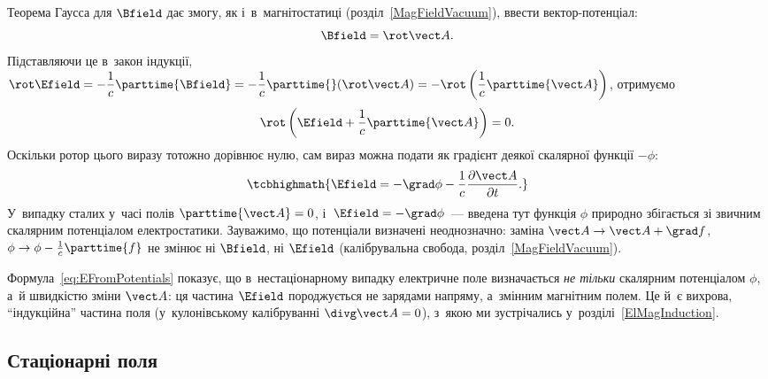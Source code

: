 Теорема Гаусса для $\Bfield$ дає змогу, як і~в~магнітостатиці (розділ~\ref{MagFieldVacuum}),
ввести вектор-потенціал:
\begin{equation*}
	\Bfield = \rot\vect A.
\end{equation*}
Підставляючи це в~закон індукції, $\rot\Efield = -\dfrac1c\parttime{\Bfield} =
-\dfrac1c\parttime{}(\rot\vect A) = -\rot\left(\dfrac1c \parttime{\vect A}\right)$,
отримуємо
\begin{equation*}
	\rot\left(\Efield+\frac1c\parttime{\vect A}\right) = 0.
\end{equation*}
Оскільки ротор цього виразу тотожно дорівнює нулю, сам вираз можна подати як градієнт
деякої скалярної функції $-\phi$:
\begin{equation}\label{eq:EFromPotentials}
	\tcbhighmath{
		\Efield = -\grad\phi - \frac1c\frac{\partial\vect A}{\partial t}.
	}
\end{equation}
У~випадку сталих у~часі полів $\parttime{\vect A}=0$, і~$\Efield=-\grad\phi$~--- введена
тут функція $\phi$ природно збігається зі звичним скалярним потенціалом електростатики.
Зауважимо, що потенціали визначені неоднозначно: заміна $\vect A\to\vect A+\grad f$,
$\phi\to\phi-\frac1c\parttime{f}$ не змінює ні $\Bfield$, ні $\Efield$ (калібрувальна
свобода, розділ~\ref{MagFieldVacuum}).

Формула~\eqref{eq:EFromPotentials} показує, що в~нестаціонарному випадку електричне поле визначається \emph{не тільки} скалярним потенціалом $\phi$, а~й швидкістю зміни $\vect A$: ця частина $\Efield$ породжується не зарядами напряму, а~змінним магнітним полем. Це й~є вихрова, \enquote{індукційна} частина поля (у~кулонівському калібруванні $\divg\vect A = 0$), з~якою ми зустрічались у~розділі~\ref{ElMagInduction}.


\subsection*{Стаціонарні поля}



